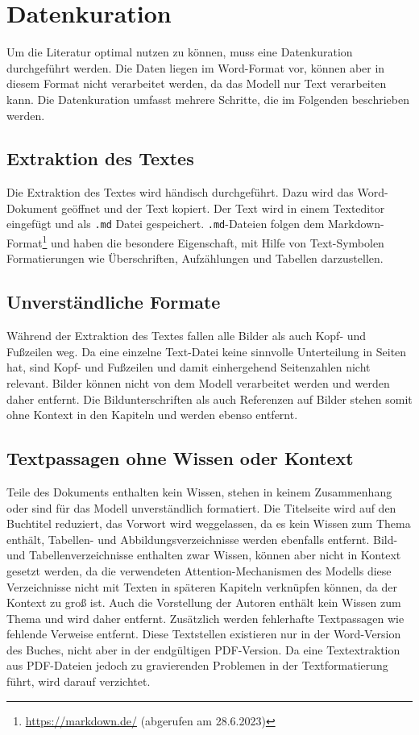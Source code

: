 \section{Datenkuration}\label{sec:datenkuration}
Um die Literatur optimal nutzen zu können, muss eine Datenkuration durchgeführt werden.
Die Daten liegen im Word-Format vor, können aber in diesem Format nicht verarbeitet werden, da das Modell nur Text verarbeiten kann.
Die Datenkuration umfasst mehrere Schritte, die im Folgenden beschrieben werden.\\

\subsection{Extraktion des Textes}
Die Extraktion des Textes wird händisch durchgeführt.
Dazu wird das Word-Dokument geöffnet und der Text kopiert.
Der Text wird in einem Texteditor eingefügt und als \texttt{.md} Datei gespeichert.
\texttt{.md}-Dateien folgen dem Markdown-Format\footnote{\url{https://markdown.de/} (abgerufen am 28.6.2023)} und haben die besondere Eigenschaft, mit Hilfe von Text-Symbolen Formatierungen wie Überschriften, Aufzählungen und Tabellen darzustellen.

\subsection{Unverständliche Formate}
Während der Extraktion des Textes fallen alle Bilder als auch Kopf- und Fußzeilen weg.
Da eine einzelne Text-Datei keine sinnvolle Unterteilung in Seiten hat, sind Kopf- und Fußzeilen und damit einhergehend Seitenzahlen nicht relevant.
Bilder können nicht von dem Modell verarbeitet werden und werden daher entfernt.
Die Bildunterschriften als auch Referenzen auf Bilder stehen somit ohne Kontext in den Kapiteln und werden ebenso entfernt.

\subsection{Textpassagen ohne Wissen oder Kontext}
Teile des Dokuments enthalten kein Wissen, stehen in keinem Zusammenhang oder sind für das Modell unverständlich formatiert.
Die Titelseite wird auf den Buchtitel reduziert, das Vorwort wird weggelassen, da es kein Wissen zum Thema enthält, Tabellen- und Abbildungsverzeichnisse werden ebenfalls entfernt.
Bild- und Tabellenverzeichnisse enthalten zwar Wissen, können aber nicht in Kontext gesetzt werden, da die verwendeten Attention-Mechanismen des Modells diese Verzeichnisse nicht mit Texten in späteren Kapiteln verknüpfen können, da der Kontext zu groß ist.
Auch die Vorstellung der Autoren enthält kein Wissen zum Thema und wird daher entfernt.
Zusätzlich werden fehlerhafte Textpassagen wie fehlende Verweise entfernt.
Diese Textstellen existieren nur in der Word-Version des Buches, nicht aber in der endgültigen PDF-Version.
Da eine Textextraktion aus PDF-Dateien jedoch zu gravierenden Problemen in der Textformatierung führt, wird darauf verzichtet.


